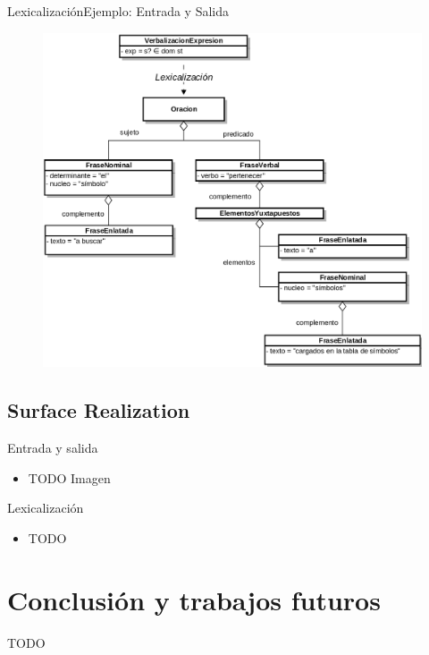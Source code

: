 \documentclass{beamer}
\begin{document}
\begin{frame}[fragile]{Lexicalización}{Ejemplo: Entrada y Salida}
  
  \begin{figure}[H]
    \centering
    \includegraphics[scale=0.16]{img/phrase_spec_ej.png}
  \end{figure}

\end{frame}

\subsection{Surface Realization}

\begin{frame}{Entrada y salida}{}
  \begin{itemize}
    \item TODO Imagen
  \end{itemize}
\end{frame}
                                
\begin{frame}{Lexicalización}{}
  \begin{itemize}
    \item TODO
  \end{itemize}
\end{frame}
                                
\section{Conclusión y trabajos futuros}
\begin{frame}{TODO}{}
                                            
\end{frame}
                                
\end{document}
